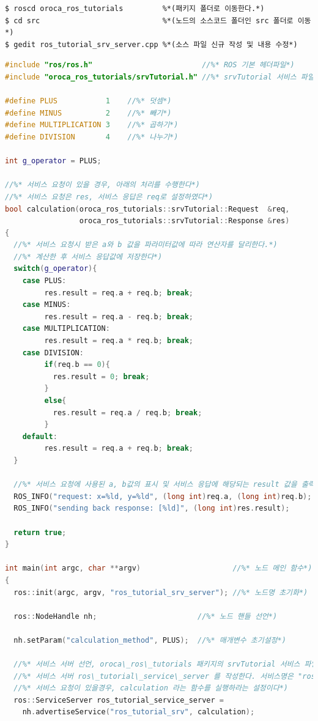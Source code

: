 \begin{lstlisting}[language=ROS]
$ roscd oroca_ros_tutorials         %*(패키지 폴더로 이동한다.*)
$ cd src                            %*(노드의 소스코드 폴더인 src 폴더로 이동*)
$ gedit ros_tutorial_srv_server.cpp %*(소스 파일 신규 작성 및 내용 수정*)
\end{lstlisting}

\begin{lstlisting}[language=C++]
#include "ros/ros.h"                         //%* ROS 기본 헤더파일*)
#include "oroca_ros_tutorials/srvTutorial.h" //%* srvTutorial 서비스 파일 헤더*)
 
#define PLUS           1    //%* 덧셈*)
#define MINUS          2    //%* 빼기*)
#define MULTIPLICATION 3    //%* 곱하기*)
#define DIVISION       4    //%* 나누기*)
 
int g_operator = PLUS;
 
//%* 서비스 요청이 있을 경우, 아래의 처리를 수행한다*)
//%* 서비스 요청은 res, 서비스 응답은 req로 설정하였다*)
bool calculation(oroca_ros_tutorials::srvTutorial::Request  &req,
                 oroca_ros_tutorials::srvTutorial::Response &res)
{
  //%* 서비스 요청시 받은 a와 b 값을 파라미터값에 따라 연산자를 달리한다.*)
  //%* 계산한 후 서비스 응답값에 저장한다*)
  switch(g_operator){
    case PLUS:
         res.result = req.a + req.b; break;
    case MINUS:
         res.result = req.a - req.b; break;
    case MULTIPLICATION:
         res.result = req.a * req.b; break;  
    case DIVISION:
         if(req.b == 0){
           res.result = 0; break;
         }  
         else{
           res.result = req.a / req.b; break;  
         }
    default:
         res.result = req.a + req.b; break;
  }
 
  //%* 서비스 요청에 사용된 a, b값의 표시 및 서비스 응답에 해당되는 result 값을 출력한다*)
  ROS_INFO("request: x=%ld, y=%ld", (long int)req.a, (long int)req.b);
  ROS_INFO("sending back response: [%ld]", (long int)res.result);
 
  return true;
}
 
int main(int argc, char **argv)                     //%* 노드 메인 함수*)
{
  ros::init(argc, argv, "ros_tutorial_srv_server"); //%* 노드명 초기화*)
 
  ros::NodeHandle nh;                       //%* 노드 핸들 선언*)
 
  nh.setParam("calculation_method", PLUS);  //%* 매개변수 초기설정*)
 
  //%* 서비스 서버 선언, oroca\_ros\_tutorials 패키지의 srvTutorial 서비스 파일을 이용한*)
  //%* 서비스 서버 ros\_tutorial\_service\_server 를 작성한다. 서비스명은 "ros\_tutorial\_srv" 이며,*)
  //%* 서비스 요청이 있을경우, calculation 라는 함수를 실행하라는 설정이다*)
  ros::ServiceServer ros_tutorial_service_server =
    nh.advertiseService("ros_tutorial_srv", calculation);
 

\end{lstlisting}
